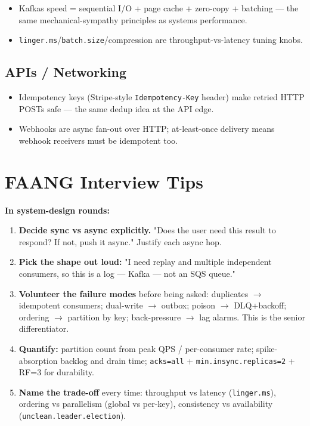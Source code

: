 \documentclass[11pt]{article}
\providecommand{\tightlist}{\setlength{\itemsep}{1pt}\setlength{\parskip}{0pt}}
\begin{document}
\begin{itemize}
\tightlist
\item
  Kafka\textquotesingle s speed = sequential I/O + page cache + zero-copy + batching --- the same mechanical-sympathy principles as systems performance.
\item
  \texttt{linger.ms}/\texttt{batch.size}/compression are throughput-vs-latency tuning knobs.
\end{itemize}

\subsection{APIs / Networking}\label{apis--networking}

\begin{itemize}
\tightlist
\item
  Idempotency keys (Stripe-style \texttt{Idempotency-Key} header) make retried HTTP POSTs safe --- the same dedup idea at the API edge.
\item
  Webhooks are async fan-out over HTTP; at-least-once delivery means webhook receivers must be idempotent too.
\end{itemize}

\section{FAANG Interview Tips}\label{faang-interview-tips}

\textbf{In system-design rounds:}

\begin{enumerate}
\def\labelenumi{\arabic{enumi}.}
\tightlist
\item
  \textbf{Decide sync vs async explicitly.} "Does the user need this result to respond? If not, push it async." Justify each async hop.
\item
  \textbf{Pick the shape out loud:} "I need replay and multiple independent consumers, so this is a log --- Kafka --- not an SQS queue."
\item
  \textbf{Volunteer the failure modes} before being asked: duplicates \(\rightarrow\) idempotent consumers; dual-write \(\rightarrow\) outbox; poison \(\rightarrow\) DLQ+backoff; ordering \(\rightarrow\) partition by key; back-pressure \(\rightarrow\) lag alarms. This is the senior differentiator.
\item
  \textbf{Quantify:} partition count from peak QPS / per-consumer rate; spike-absorption backlog and drain time; \texttt{acks=all} + \texttt{min.insync.replicas=2} + RF=3 for durability.
\item
  \textbf{Name the trade-off} every time: throughput vs latency (\texttt{linger.ms}), ordering vs parallelism (global vs per-key), consistency vs availability (\texttt{unclean.leader.election}).
\end{enumerate}
\end{document}
